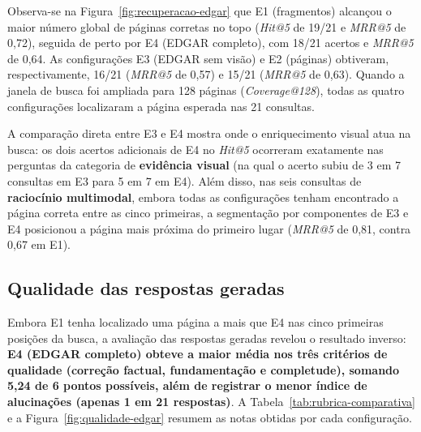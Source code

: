 Observa-se na Figura~\ref{fig:recuperacao-edgar} que E1 (fragmentos) alcançou o maior número global de páginas corretas no topo (\textit{Hit@5} de 19/21 e \textit{MRR@5} de 0,72), seguida de perto por E4 (EDGAR completo), com 18/21 acertos e \textit{MRR@5} de 0,64. As configurações E3 (EDGAR sem visão) e E2 (páginas) obtiveram, respectivamente, 16/21 (\textit{MRR@5} de 0,57) e 15/21 (\textit{MRR@5} de 0,63). Quando a janela de busca foi ampliada para 128 páginas (\textit{Coverage@128}), todas as quatro configurações localizaram a página esperada nas 21 consultas.

A comparação direta entre E3 e E4 mostra onde o enriquecimento visual atua na busca: os dois acertos adicionais de E4 no \textit{Hit@5} ocorreram exatamente nas perguntas da categoria de \textbf{evidência visual} (na qual o acerto subiu de 3 em 7 consultas em E3 para 5 em 7 em E4). Além disso, nas seis consultas de \textbf{raciocínio multimodal}, embora todas as configurações tenham encontrado a página correta entre as cinco primeiras, a segmentação por componentes de E3 e E4 posicionou a página mais próxima do primeiro lugar (\textit{MRR@5} de 0,81, contra 0,67 em E1).

\subsection{Qualidade das respostas geradas}
\label{sec:qualidade-respostas}

Embora E1 tenha localizado uma página a mais que E4 nas cinco primeiras posições da busca, a avaliação das respostas geradas revelou o resultado inverso: \textbf{E4 (EDGAR completo) obteve a maior média nos três critérios de qualidade (correção factual, fundamentação e completude), somando 5,24 de 6 pontos possíveis, além de registrar o menor índice de alucinações (apenas 1 em 21 respostas)}. A Tabela~\ref{tab:rubrica-comparativa} e a Figura~\ref{fig:qualidade-edgar} resumem as notas obtidas por cada configuração.


